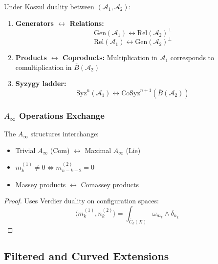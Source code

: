 \begin{theorem}
Under Koszul duality between $(\mathcal{A}_1, \mathcal{A}_2)$:
\begin{enumerate}
\item \textbf{Generators $\leftrightarrow$ Relations:}
$$\text{Gen}(\mathcal{A}_1) \leftrightarrow \text{Rel}(\mathcal{A}_2)^{\perp}$$
$$\text{Rel}(\mathcal{A}_1) \leftrightarrow \text{Gen}(\mathcal{A}_2)^{\perp}$$

\item \textbf{Products $\leftrightarrow$ Coproducts:}
Multiplication in $\mathcal{A}_1$ corresponds to comultiplication in $\bar{B}(\mathcal{A}_2)$

\item \textbf{Syzygy ladder:}
$$\text{Syz}^n(\mathcal{A}_1) \leftrightarrow \text{CoSyz}^{n+1}(\bar{B}(\mathcal{A}_2))$$
\end{enumerate}
\end{theorem}

\subsubsection{$A_\infty$ Operations Exchange}

\begin{theorem}
The $A_\infty$ structures interchange:
\begin{itemize}
\item Trivial $A_\infty$ (Com) $\leftrightarrow$ Maximal $A_\infty$ (Lie)
\item $m_k^{(1)} \neq 0 \Leftrightarrow m_{n-k+2}^{(2)} = 0$
\item Massey products $\leftrightarrow$ Comassey products
\end{itemize}
\end{theorem}

\begin{proof}
Uses Verdier duality on configuration spaces:
$$\langle m_k^{(1)}, n_k^{(2)} \rangle = \int_{\overline{C}_k(X)} \omega_{m_k} \wedge \delta_{n_k}$$
\end{proof}


\subsection{Filtered and Curved Extensions}

